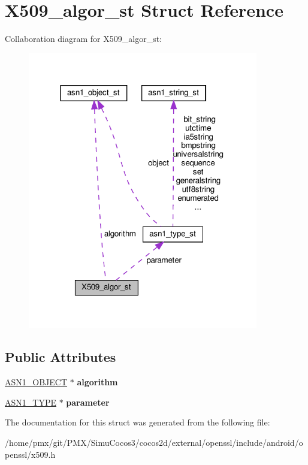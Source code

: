 \hypertarget{structX509__algor__st}{}\section{X509\+\_\+algor\+\_\+st Struct Reference}
\label{structX509__algor__st}


Collaboration diagram for X509\+\_\+algor\+\_\+st\+:
\nopagebreak
\begin{figure}[H]
\begin{center}
\leavevmode
\includegraphics[width=285pt]{structX509__algor__st__coll__graph}
\end{center}
\end{figure}
\subsection*{Public Attributes}
\begin{DoxyCompactItemize}
\item 
\mbox{\label{structX509__algor__st_a41fe54687856c1c32234445dd606c453}} 
\hyperlink{structasn1__object__st}{A\+S\+N1\+\_\+\+O\+B\+J\+E\+CT} $\ast$ {\bfseries algorithm}
\item 
\mbox{\label{structX509__algor__st_a49aaa27c9a8c2dff31905c2bf05ad3eb}} 
\hyperlink{structasn1__type__st}{A\+S\+N1\+\_\+\+T\+Y\+PE} $\ast$ {\bfseries parameter}
\end{DoxyCompactItemize}


The documentation for this struct was generated from the following file\+:\begin{DoxyCompactItemize}
\item 
/home/pmx/git/\+P\+M\+X/\+Simu\+Cocos3/cocos2d/external/openssl/include/android/openssl/x509.\+h\end{DoxyCompactItemize}
